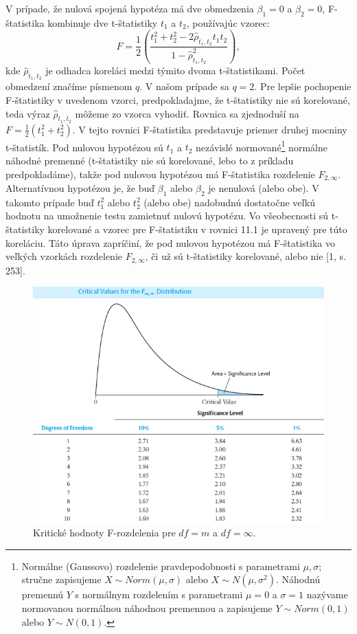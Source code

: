 \documentclass[]{tukediphc}
\begin{document}
V prípade, že nulová spojená hypotéza má dve obmedzenia $\beta_{1} = 0$ a $\beta_{2} = 0$, F-štatistika kombinuje dve t-štatistiky $t_1$ a $t_2$, používajúc vzorec:
\begin{equation}
    F = \frac{1}{2}\left(\frac{t_{1}^2+t_{2}^2-2{{\hat\rho_{t_{1},t_{2}}}}t_{1}t_{2}}{1-\hat{\rho}_{t_{1},t_{2}}^2}\right),
\end{equation}
kde $\hat\rho_{t_{1},t_{2}}$ je odhadca koreláci medzi týmito dvoma t-štatistikami. Počet obmedzení značíme písmenom $q$. V našom prípade sa $q = 2$. 
Pre lepšie pochopenie F-štatistiky v uvedenom vzorci, predpokladajme, že t-štatistiky nie sú korelované, teda výraz $\hat\rho_{t_{1},t_{2}}$ môžeme zo vzorca vyhodiť. Rovnica sa zjednoduší na $F = \frac{1}{2}(t^2_{1} + t^2_{2})$. V tejto rovnici F-štatistika predstavuje priemer druhej mocniny t-štatistík. Pod nulovou hypotézou sú $t_1$ a $t_2$ nezávislé normované\footnote{Normálne (Gaussovo) rozdelenie pravdepodobnosti s parametrami $\mu, \sigma$; stručne zapisujeme $X \sim Norm(\mu,\sigma)$ alebo $X \sim N(\mu, \sigma^2)$. Náhodnú premennú $Y$ s normálnym rozdelením s parametrami $\mu =0$ a $\sigma =1$ nazývame normovanou normálnou náhodnou premennou a zapisujeme $Y \sim Norm(0,1)$ alebo $Y \sim N(0,1)$.} normálne náhodné premenné (t-štatistiky nie sú korelované, lebo to z príkladu predpokladáme), takže pod nulovou hypotézou má F-štatistika rozdelenie $F_{2,\infty}$. Alternatívnou hypotézou je, že buď $\beta_{1}$ alebo $\beta_{2}$ je nenulová (alebo obe). V takomto prípade buď $t^2_{1}$ alebo $t^2_{2}$ (alebo obe) nadobudnú dostatočne veľkú hodnotu na umožnenie testu zamietnuť nulovú hypotézu. Vo všeobecnosti sú t-štatistiky korelované a vzorec pre F-štatistiku v rovnici 11.1 je upravený pre túto koreláciu. Táto úprava zapríčiní, že pod nulovou hypotézou má F-štatistika vo veľkých vzorkách rozdelenie $F_{2,\infty}$, či už sú t-štatistiky korelované, alebo nie [1, s. 253]. 

\begin{figure}[!ht] 
    \centering 
    \includegraphics[scale = 0.8]{diplomka obrazky/14.png} 
    \caption{Kritické hodnoty F-rozdelenia pre $df = m$ a $df = \infty$.} 
\end{figure} 
\end{document}
